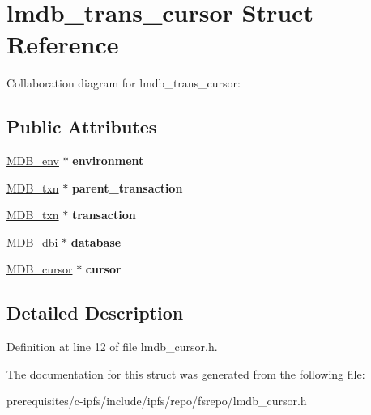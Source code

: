 \hypertarget{structlmdb__trans__cursor}{}\section{lmdb\+\_\+trans\+\_\+cursor Struct Reference}
\label{structlmdb__trans__cursor}


Collaboration diagram for lmdb\+\_\+trans\+\_\+cursor\+:
\subsection*{Public Attributes}
\begin{DoxyCompactItemize}
\item 
\mbox{\label{structlmdb__trans__cursor_addf767969f858161c241512e72508ea6}} 
\mbox{\hyperlink{struct_m_d_b__env}{M\+D\+B\+\_\+env}} $\ast$ {\bfseries environment}
\item 
\mbox{\label{structlmdb__trans__cursor_ab1b5d3e872d6d89e7593da8a77bbd4b2}} 
\mbox{\hyperlink{struct_m_d_b__txn}{M\+D\+B\+\_\+txn}} $\ast$ {\bfseries parent\+\_\+transaction}
\item 
\mbox{\label{structlmdb__trans__cursor_a9b8f4fd296a988d1a2000323073c700c}} 
\mbox{\hyperlink{struct_m_d_b__txn}{M\+D\+B\+\_\+txn}} $\ast$ {\bfseries transaction}
\item 
\mbox{\label{structlmdb__trans__cursor_af93a3a1c67a8e4b804e724173b0ee8d1}} 
\mbox{\hyperlink{group__mdb_gadbe68a06c448dfb62da16443d251a78b}{M\+D\+B\+\_\+dbi}} $\ast$ {\bfseries database}
\item 
\mbox{\label{structlmdb__trans__cursor_a9f9cd39000fe29407e8a1d383e66482d}} 
\mbox{\hyperlink{struct_m_d_b__cursor}{M\+D\+B\+\_\+cursor}} $\ast$ {\bfseries cursor}
\end{DoxyCompactItemize}


\subsection{Detailed Description}


Definition at line 12 of file lmdb\+\_\+cursor.\+h.



The documentation for this struct was generated from the following file\+:\begin{DoxyCompactItemize}
\item 
prerequisites/c-\/ipfs/include/ipfs/repo/fsrepo/lmdb\+\_\+cursor.\+h\end{DoxyCompactItemize}
